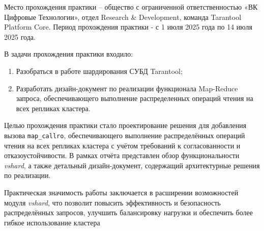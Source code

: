 \introduction

Место прохождения практики – общество с ограниченной ответственностью «ВК
Цифровые Технологии», отдел Research \& Development, команда Tarantool Platform
Core. Период прохождения практики - с 1 июля 2025 года по 14 июля 2025 года.

В задачи прохождения практики входило:

\begin{enumerate}
    \item Разобраться в работе шардирования СУБД Tarantool;
    \item Разработать дизайн-документ по реализации функционала Map-Reduce
          запроса, обеспечивающего выполнение распределенных операций чтения на
          всех репликах кластера.
\end{enumerate}

Целью прохождения практики стало проектирование решения для добавления вызова
\texttt{map\_callro}, обеспечивающего выполнение распределённых операций чтения
на всех репликах кластера с учётом требований к согласованности и
отказоустойчивости. В рамках отчёта представлен обзор функциональности
\textit{vshard}, а
также детальный дизайн-документ, содержащий архитектурные решения по реализации.

Практическая значимость работы заключается в расширении возможностей модуля
\textit{vshard}, что позволит повысить эффективность и безопасность
распределённых запросов, улучшить балансировку нагрузки и обеспечить более
гибкое использование кластера
